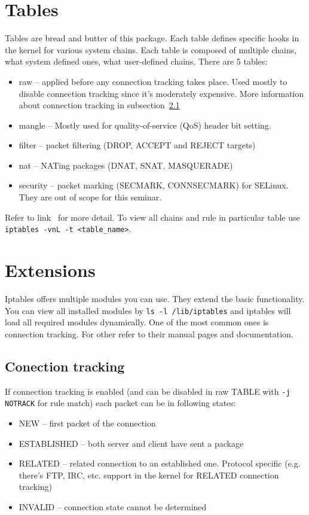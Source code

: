\documentclass[times, utf8, seminar, english]{fer}
\begin{document}
\section{Tables}
    Tables are bread and butter of this package. Each table defines specific hooks in the kernel for various system chains. Each table is composed of multiple chains, what system defined ones, what user-defined chains.
    There are 5 tables:
    \begin{itemize}
        \item raw -- applied before any connection tracking takes place. Used mostly to disable connection tracking since it's moderately expensive. More information about connection tracking in subsection~\ref{subsec:conn-track}
        \item mangle -- Mostly used for quality-of-service (QoS) header bit setting.
        \item filter -- packet filtering (DROP, ACCEPT and REJECT targets)
        \item nat -- NATing packages (DNAT, SNAT, MASQUERADE)
        \item security -- packet marking (SECMARK, CONNSECMARK) for SELinux. They are out of scope for this seminar.
    \end{itemize}
    Refer to link~\cite{Iptables27:online} for more detail. To view all chains and rule in particular table use \verb|iptables -vnL -t <table_name>|.

\section{Extensions}
    Iptables offers multiple modules you can use. They extend the basic functionality.
    You can view all installed modules by \texttt{ls -l /lib/iptables} and iptables will load all required modules dynamically. One of the most common ones is connection tracking. For other refer to their manual pages and documentation.

    \subsection{Conection tracking}
    \label{subsec:conn-track}
    If connection tracking is enabled (and can be disabled in raw TABLE with \texttt{-j NOTRACK} for rule match) each packet can be in following states:
    \begin{itemize}
        \item NEW -- first packet of the connection
        \item ESTABLISHED -- both server and client have sent a package
        \item RELATED -- related connection to an established one. Protocol specific (e.g. there's FTP, IRC, etc. support in the kernel for RELATED connection tracking)
        \item INVALID -- connection state cannot be determined
    \end{itemize}
\end{document}
